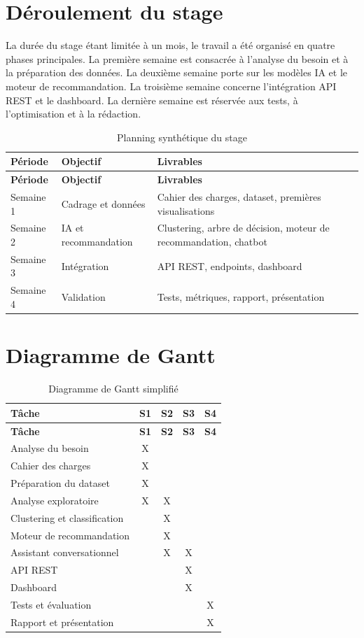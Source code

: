 \documentclass[12pt,a4paper]{report}
\begin{document}
\section{Déroulement du stage}

La durée du stage étant limitée à un mois, le travail a été organisé en quatre phases principales. La première semaine est consacrée à l'analyse du besoin et à la préparation des données. La deuxième semaine porte sur les modèles IA et le moteur de recommandation. La troisième semaine concerne l'intégration API REST et le dashboard. La dernière semaine est réservée aux tests, à l'optimisation et à la rédaction.

\begin{longtable}{|p{2.5cm}|p{5cm}|p{6cm}|}
\caption{Planning synthétique du stage}\\
\hline
\textbf{Période} & \textbf{Objectif} & \textbf{Livrables} \\
\hline
\endfirsthead
\hline
\textbf{Période} & \textbf{Objectif} & \textbf{Livrables} \\
\hline
\endhead
Semaine 1 & Cadrage et données & Cahier des charges, dataset, premières visualisations \\
\hline
Semaine 2 & IA et recommandation & Clustering, arbre de décision, moteur de recommandation, chatbot \\
\hline
Semaine 3 & Intégration & API REST, endpoints, dashboard \\
\hline
Semaine 4 & Validation & Tests, métriques, rapport, présentation \\
\hline
\end{longtable}

\section{Diagramme de Gantt}

\begin{longtable}{|p{4.5cm}|c|c|c|c|}
\caption{Diagramme de Gantt simplifié}\\
\hline
\textbf{Tâche} & \textbf{S1} & \textbf{S2} & \textbf{S3} & \textbf{S4} \\
\hline
\endfirsthead
\hline
\textbf{Tâche} & \textbf{S1} & \textbf{S2} & \textbf{S3} & \textbf{S4} \\
\hline
\endhead
Analyse du besoin & X & & & \\
\hline
Cahier des charges & X & & & \\
\hline
Préparation du dataset & X & & & \\
\hline
Analyse exploratoire & X & X & & \\
\hline
Clustering et classification & & X & & \\
\hline
Moteur de recommandation & & X & & \\
\hline
Assistant conversationnel & & X & X & \\
\hline
API REST & & & X & \\
\hline
Dashboard & & & X & \\
\hline
Tests et évaluation & & & & X \\
\hline
Rapport et présentation & & & & X \\
\hline
\end{longtable}
\end{document}

